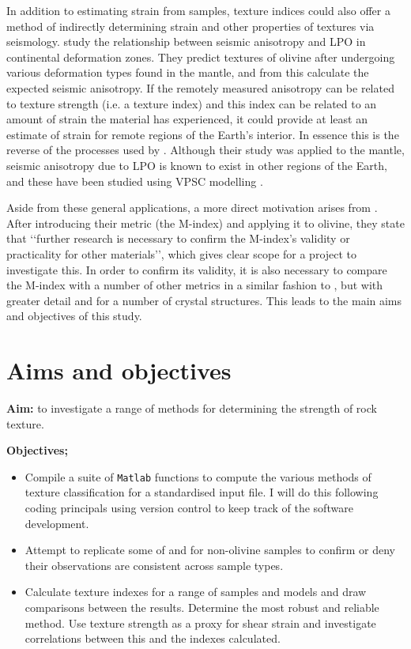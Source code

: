 \documentclass[a4paper,12pt]{report}
\numberwithin{equation}{chapter}
\begin{document}
In addition to estimating strain from samples, texture indices could also offer a method of indirectly determining strain and other properties of textures via seismology. \cite{Tommasi1999} study the relationship between seismic anisotropy and LPO in continental deformation zones. They predict textures of olivine after undergoing various deformation types found in the mantle, and from this calculate the expected seismic anisotropy. If the remotely measured anisotropy can be related to texture strength (i.e. a texture index) and this index can be related to an amount of strain the material has experienced, it could provide at least an estimate of strain for remote regions of the Earth's interior. In essence this is the reverse of the processes used by \cite{Tommasi1999}. Although their study was applied to the mantle, seismic anisotropy due to LPO is known to exist in other regions of the Earth, and these have been studied using VPSC modelling \citep[e.g.][]{Wenk1999}.   

Aside from these general applications, a more direct motivation arises from \cite{Skemer}. After introducing their metric (the M-index) and applying it to olivine, they state that \lq\lq{}further research is necessary to confirm the M-index's validity or practicality for other materials\rq\rq{}, which gives clear scope for a project to investigate this. In order to confirm its validity, it is also necessary to compare the M-index with a number of other metrics in a similar fashion to \cite{Mainprice}, but with greater detail and for a number of crystal structures. This leads to the main aims and objectives of this study.   





\section{Aims and objectives} \label{sec:aims+objs}
\noindent
\textbf{Aim:} to investigate a range of methods for determining the strength of rock texture.

\noindent	 
\textbf{Objectives;}
	\begin{itemize}
		\item Compile a suite of \texttt{Matlab} functions to compute the various methods of texture classification for a standardised input file. I will do this following coding principals \citep{Computing} using version control to keep track of the software development.
		\item Attempt to replicate some of \cite{Skemer} and \cite{Mainprice} for non-olivine samples to confirm or deny their observations are consistent across sample types.
		\item Calculate texture indexes for a range of samples and models and draw comparisons between the results. Determine the most robust and reliable method. Use texture strength as a proxy for shear strain and investigate correlations between this and the indexes calculated.
	\end{itemize}
\end{document}
